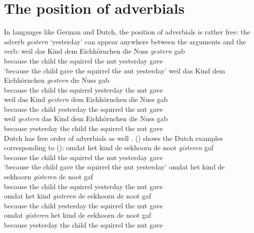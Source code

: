 \section{The position of adverbials}
\label{sec-phenomena-position-of-adverbials}

In languages like German and Dutch, the position of adverbials is rather free: the adverb \emph{gestern}
`yesterday' can appear anywhere between the arguments and the verb:
\eal
\ex
\gll weil das Kind dem Eichhörnchen die Nuss \emph{gestern} gab\\ 
     because the child the squirrel the nut yesterday gave\\\german
\glt `because the child gave the squirrel the nut yesterday'
\ex 
\gll weil das Kind dem Eichhörnchen \emph{gestern} die Nuss gab\\
     because the child the squirrel yesterday the nut gave\\
\ex 
\gll weil das Kind \emph{gestern} dem Eichhörnchen die Nuss gab\\
     because the child yesterday the squirrel the nut gave\\
\ex 
\gll weil \emph{gestern} das Kind dem Eichhörnchen die Nuss gab\\
     because yesterday the child the squirrel the nut gave\\
\zl
Dutch has free order of adverbials as well \parencites[]{Koster99a-u}[Section~6]{Bouma2003a-u}. () shows the Dutch examples corresponding to ():
\eal
\ex
\gll omdat het kind de eekhoorn de noot \emph{gisteren} gaf\\ 
     because the child the squirrel the nut yesterday gave\\\dutch
\glt `because the child gave the squirrel the nut yesterday'
\ex 
\gll omdat het kind de eekhoorn \emph{gisteren} de noot gaf\\
     because the child the squirrel yesterday the nut gave\\
\ex 
\gll omdat het kind \emph{gisteren} de eekhoorn de noot gaf\\
     because the child yesterday the squirrel the nut gave\\
\ex 
\gll omdat \emph{gisteren} het kind de eekhoorn de noot gaf\\
     because yesterday the child the squirrel the nut gave\\
\zl



